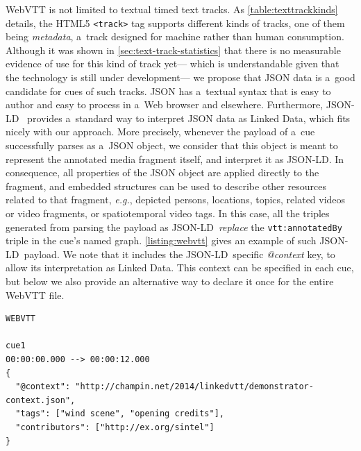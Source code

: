 \documentclass{sig-alternate}
\newcommand{\vtt}[1]{\texttt{vtt:#1}}
\def\JSONLD{\mbox{JSON-LD}}
\begin{document}
WebVTT is not limited to textual timed text tracks.
As \autoref{table:texttrackkinds} details, the HTML5
\texttt{<track>} tag supports different kinds of tracks,
one of them being \textit{metadata},
a~track designed for machine rather than human consumption.
Although it was shown in \autoref{sec:text-track-statistics}
that there is no measurable evidence of use for this kind of track yet---%
which is understandable given that the technology
is still under development---%
we propose that JSON data is a~good candidate for cues of such tracks.
JSON has a~textual syntax that is easy to author
and easy to process in a~Web browser and elsewhere.
Furthermore, \JSONLD~\cite{sporny2013jsonld} provides
a~standard way to interpret JSON data as Linked Data,
which fits nicely with our approach.
More precisely, whenever the payload of a~cue
successfully parses as a~JSON object,
we consider that this object is meant to
represent the annotated media fragment itself,
and interpret it as \JSONLD.
In consequence, all properties of the JSON object
are applied directly to the fragment,
and embedded structures can be used to describe
other resources related to that fragment,
\emph{e.g.}, depicted persons, locations, topics, related videos
or video fragments, or spatiotemporal video tags.
In this case, all the triples generated from parsing the payload as \JSONLD\
\emph{replace} the \vtt{annotatedBy} triple in the cue's named graph.
\autoref{listing:webvtt} gives an example of such \JSONLD\ payload.
We note that it includes the \JSONLD\ specific \emph{@context} key,
to allow its interpretation as Linked Data.
This context can be specified in each cue,
but below we also provide an alternative way to declare it once
for the entire WebVTT file.

\begin{lstlisting}[caption={Sample WebVTT metadata file with \JSONLD\
  payload in a~cue identified as ``cue1''},
  label=listing:webvtt, float=t!]
WEBVTT

cue1
00:00:00.000 --> 00:00:12.000
{
  "@context": "http://champin.net/2014/linkedvtt/demonstrator-context.json",
  "tags": ["wind scene", "opening credits"],
  "contributors": ["http://ex.org/sintel"]
}
\end{lstlisting}
\end{document}
